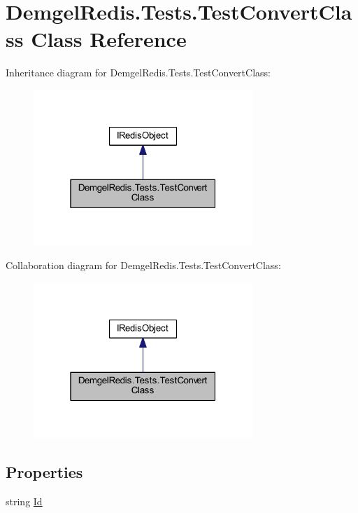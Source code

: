 \hypertarget{class_demgel_redis_1_1_tests_1_1_test_convert_class}{}\section{Demgel\+Redis.\+Tests.\+Test\+Convert\+Class Class Reference}
\label{class_demgel_redis_1_1_tests_1_1_test_convert_class}


Inheritance diagram for Demgel\+Redis.\+Tests.\+Test\+Convert\+Class\+:
\nopagebreak
\begin{figure}[H]
\begin{center}
\leavevmode
\includegraphics[width=235pt]{class_demgel_redis_1_1_tests_1_1_test_convert_class__inherit__graph}
\end{center}
\end{figure}


Collaboration diagram for Demgel\+Redis.\+Tests.\+Test\+Convert\+Class\+:
\nopagebreak
\begin{figure}[H]
\begin{center}
\leavevmode
\includegraphics[width=235pt]{class_demgel_redis_1_1_tests_1_1_test_convert_class__coll__graph}
\end{center}
\end{figure}
\subsection*{Properties}
\begin{DoxyCompactItemize}
\item 
string \hyperlink{class_demgel_redis_1_1_tests_1_1_test_convert_class_a147b72b51c19529ca603b84b3410ad3e}{Id}
\end{DoxyCompactItemize}


